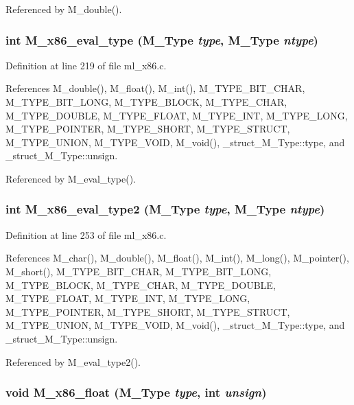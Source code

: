 Referenced by M\_\-double().
\subsubsection{\setlength{\rightskip}{0pt plus 5cm}int M\_\-x86\_\-eval\_\-type (\bf{M\_\-Type} {\em type}, \bf{M\_\-Type} {\em ntype})}\label{ml__x86_8c_96ea005a9ce63a2a4373bd068b06ebfb}




Definition at line 219 of file ml\_\-x86.c.

References M\_\-double(), M\_\-float(), M\_\-int(), M\_\-TYPE\_\-BIT\_\-CHAR, M\_\-TYPE\_\-BIT\_\-LONG, M\_\-TYPE\_\-BLOCK, M\_\-TYPE\_\-CHAR, M\_\-TYPE\_\-DOUBLE, M\_\-TYPE\_\-FLOAT, M\_\-TYPE\_\-INT, M\_\-TYPE\_\-LONG, M\_\-TYPE\_\-POINTER, M\_\-TYPE\_\-SHORT, M\_\-TYPE\_\-STRUCT, M\_\-TYPE\_\-UNION, M\_\-TYPE\_\-VOID, M\_\-void(), \_\-struct\_\-M\_\-Type::type, and \_\-struct\_\-M\_\-Type::unsign.

Referenced by M\_\-eval\_\-type().
\subsubsection{\setlength{\rightskip}{0pt plus 5cm}int M\_\-x86\_\-eval\_\-type2 (\bf{M\_\-Type} {\em type}, \bf{M\_\-Type} {\em ntype})}\label{ml__x86_8c_f197e50e784711edd9f5b48e06b536f5}




Definition at line 253 of file ml\_\-x86.c.

References M\_\-char(), M\_\-double(), M\_\-float(), M\_\-int(), M\_\-long(), M\_\-pointer(), M\_\-short(), M\_\-TYPE\_\-BIT\_\-CHAR, M\_\-TYPE\_\-BIT\_\-LONG, M\_\-TYPE\_\-BLOCK, M\_\-TYPE\_\-CHAR, M\_\-TYPE\_\-DOUBLE, M\_\-TYPE\_\-FLOAT, M\_\-TYPE\_\-INT, M\_\-TYPE\_\-LONG, M\_\-TYPE\_\-POINTER, M\_\-TYPE\_\-SHORT, M\_\-TYPE\_\-STRUCT, M\_\-TYPE\_\-UNION, M\_\-TYPE\_\-VOID, M\_\-void(), \_\-struct\_\-M\_\-Type::type, and \_\-struct\_\-M\_\-Type::unsign.

Referenced by M\_\-eval\_\-type2().
\subsubsection{\setlength{\rightskip}{0pt plus 5cm}void M\_\-x86\_\-float (\bf{M\_\-Type} {\em type}, int {\em unsign})}\label{ml__x86_8c_25fdc6eaf77548799196a9c31ed8e95b}




